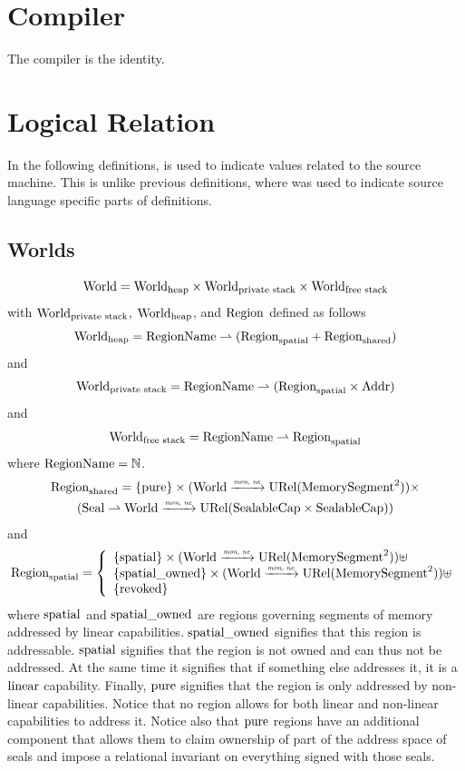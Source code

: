 \documentclass[a4paper]{article}
\begin{document}
\section{Compiler}
\label{sec:compiler}

The compiler is the identity.

\section{Logical Relation}
In the following definitions,  is used to indicate values related to the source machine. This is unlike previous definitions, where  was used to indicate source language specific parts of definitions.
\subsection{Worlds}
\label{subsec:worlds}
\[
  \mathrm{World} = \mathrm{World}_\mathrm{heap} \times \mathrm{World}_\text{private stack} \times \mathrm{World}_\text{free stack}
\]
with $\mathrm{World}_\text{private stack}$, $\mathrm{World}_\mathrm{heap}$, and $\mathrm{Region}$ defined as follows
\[
  \mathrm{World}_\mathrm{heap} = \mathrm{RegionName} \rightharpoonup (\mathrm{Region}_\mathrm{spatial} + \mathrm{Region}_\mathrm{shared})
\]
and
\[
  \mathrm{World}_\text{private stack} = \mathrm{RegionName} \rightharpoonup (\mathrm{Region}_\mathrm{spatial} \times \mathrm{Addr})
\]
and
\[
  \mathrm{World}_\text{free stack} = \mathrm{RegionName} \rightharpoonup \mathrm{Region}_\mathrm{spatial}
\]
where $\mathrm{RegionName} = \mathbb{N}$.
\begin{multline*}
  \mathrm{Region}_\mathrm{shared} = 
  \{\mathrm{pure} \} \times (\mathrm{World} \xrightarrow{\textit{\tiny{mon, ne}}} \mathrm{URel}(\mathrm{MemorySegment}^2)) \times \\
  (\mathrm{Seal} \rightharpoonup \mathrm{World} \xrightarrow{\textit{\tiny{mon, ne}}} \mathrm{URel}(\mathrm{SealableCap} \times \mathrm{SealableCap}))
\end{multline*}
and
\[
  \mathrm{Region}_\mathrm{spatial} = \left\{
  \begin{array}{l}
    \{\mathrm{spatial} \} \times (\mathrm{World} \xrightarrow{\textit{\tiny{mon, ne}}} \mathrm{URel}(\mathrm{MemorySegment}^2)) \uplus \\
    \{\mathrm{spatial\_owned} \} \times (\mathrm{World} \xrightarrow{\textit{\tiny{mon, ne}}} \mathrm{URel}(\mathrm{MemorySegment}^2))\uplus \\ 
    \{\mathrm{revoked}\}
  \end{array} \right.
\]
where $\mathrm{spatial}$ and $\mathrm{spatial\_owned}$ are regions governing segments of memory addressed by linear capabilities.
$\mathrm{spatial\_owned}$ signifies that this region is addressable.
$\mathrm{spatial}$ signifies that the region is not owned and can thus not be addressed.
At the same time it signifies that if something else addresses it, it is a $\mathrm{linear}$ capability.
Finally, $\mathrm{pure}$ signifies that the region is only addressed by non-linear capabilities.
Notice that no region allows for both linear and non-linear capabilities to address it.
Notice also that $\mathrm{pure}$ regions have an additional component that allows them to claim ownership of part of the address space of seals and impose a relational invariant on everything signed with those seals.
\end{document}
